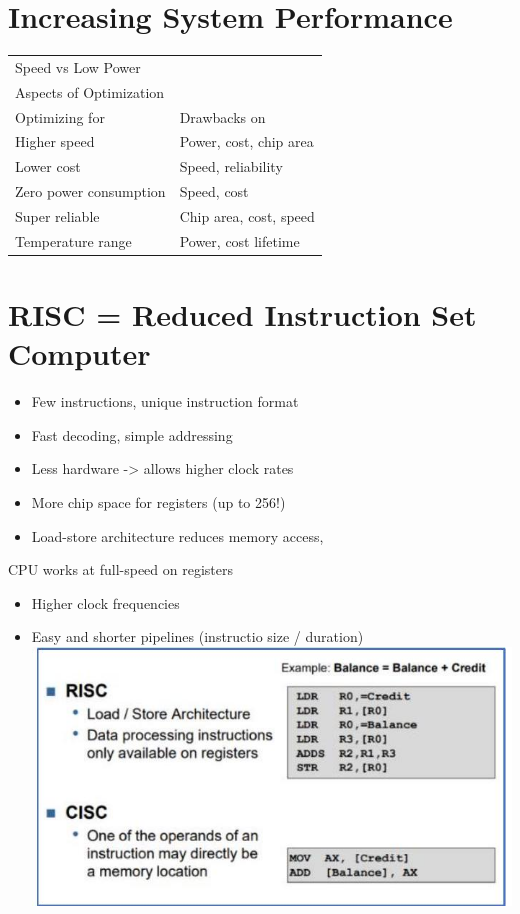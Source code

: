 \section{Increasing System Performance}

\begin{center}
    \begin{tabular}{|l|l|}
    \hline
    Speed vs Low Power &  \\
    Aspects of Optimization &  \\
    \hline
    Optimizing for & Drawbacks on \\
    \hline
    Higher speed & Power, cost, chip area \\
    \hline
    Lower cost & Speed, reliability \\
    \hline
    Zero power consumption & Speed, cost \\
    \hline
    Super reliable & Chip area, cost, speed \\
    \hline
    Temperature range & Power, cost lifetime \\
    \hline
    \end{tabular}
    \end{center}
    
    \section*{RISC = Reduced Instruction Set Computer}
    \begin{itemize}
      \item Few instructions, unique instruction format
      \item Fast decoding, simple addressing
      \item Less hardware -> allows higher clock rates
      \item More chip space for registers (up to 256!)
      \item Load-store architecture reduces memory access,
    \end{itemize}
    
    CPU works at full-speed on registers
    
    \begin{itemize}
      \item Higher clock frequencies
      \item Easy and shorter pipelines (instructio size / duration)\\
    \includegraphics[width=\linewidth]{images/2024_12_29_79e6b22f503fb7b4f718g-13(1)}
    \end{itemize}
    
